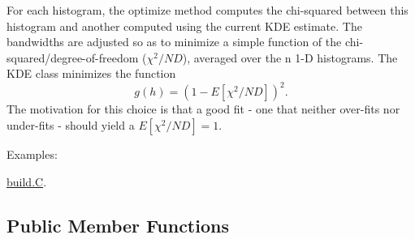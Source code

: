 For each histogram, the optimize method computes the chi-squared between this histogram and another computed using the current KDE estimate. The bandwidths are adjusted so as to minimize a simple function of the chi-squared/degree-of-freedom ($\chi^2/ND$), averaged over the n 1-D histograms. The KDE class minimizes the function \[ g(h) = (1-E[\chi^2/ND])^2. \] The motivation for this choice is that a good fit - one that neither over-fits nor under-fits - should yield a $E[\chi^2/ND] = 1$. \begin{Desc}
\item[Examples: ]\par


\hyperlink{build_8C-example}{build.C}.\end{Desc}


\subsection*{Public Member Functions}
